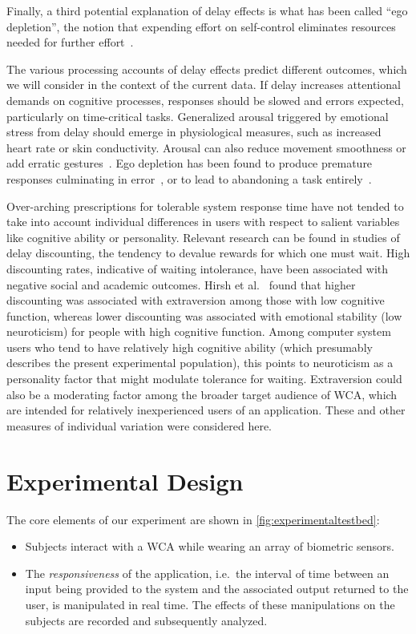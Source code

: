 \documentclass[10pt,letterpaper]{article}
\begin{document}
Finally, a third potential explanation of delay effects is what has been called ``ego depletion'', the notion that expending effort on self-control eliminates resources needed for further effort~\cite{baumeister74tice,lin2020strong}.

The various processing accounts of delay effects predict different outcomes, which we will consider in the context of the current data.
If delay increases attentional demands on cognitive processes, responses should be slowed and errors expected, particularly on time-critical tasks.
Generalized arousal triggered by emotional stress from delay should emerge in physiological measures, such as increased heart rate or skin conductivity.
Arousal can also reduce movement smoothness or add erratic gestures~\cite{pijpers2003anxiety}.
Ego depletion has been found to produce premature responses culminating in error~\cite{lin2020strong}, or to lead to abandoning a task entirely~\cite{baumeister74tice}. 

Over-arching prescriptions for tolerable system response time have not tended to take into account individual differences in users with respect to salient variables like cognitive ability or personality. 
Relevant research can be found in studies of delay discounting, the tendency to devalue rewards for which one must wait.
High discounting rates, indicative of waiting intolerance, have been associated with negative social and academic outcomes.
Hirsh et al.~\cite{hirsh2008delay} found that higher discounting was associated with extraversion among those with low cognitive function, whereas lower discounting was associated with emotional stability (low neuroticism) for people with high cognitive function.
Among computer system users who tend to have relatively high cognitive ability (which presumably describes the present experimental population), this points to neuroticism as a personality factor that might modulate tolerance for waiting. Extraversion could also  be  a moderating factor among the broader target audience of WCA, which are intended for relatively inexperienced users of an application.
These and other measures of individual variation were considered here.

\section{Experimental Design}\label{sec:experimentaldesign}

The core elements of our experiment are shown in \cref{fig:experimentaltestbed}:
\begin{itemize}
    \item Subjects interact with a WCA while wearing an array of biometric sensors.
    \item The \emph{responsiveness} of the application, i.e.\ the interval of time between an input being provided to the system and the associated output returned to the user, is manipulated in real time. 
    The effects of these manipulations on the subjects are recorded and subsequently analyzed.    
\end{itemize}
\end{document}
